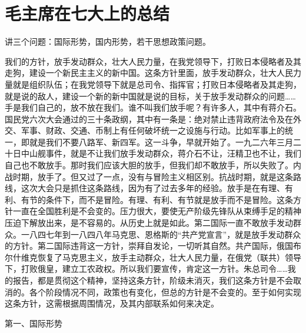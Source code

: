 \section[毛主席在七大上的总结（一九四五年六月）]{毛主席在七大上的总结}


讲三个问题：国际形势，国内形势，若干思想政策问题。

我们的方针，放手发动群众，壮大人民力量，在我党领导下，打败日本侵略者及其走狗，建设一个新民主主义的新中国。这条方针里面，放手发动群众，壮大人民力量就是组织队伍；在我党领导下就是总司令、指挥官；打败日本侵略者及其走狗，就是说的敌人，建设一个新的新中国就是说的目标，关于放手发动群众的问题……手是我们自己的，放不放在我们。谁不叫我们放手呢？有许多人，其中有蒋介石。国民党六次大会通过的三十条政纲，其中有一条是：绝对禁止违背政府法令及在外交、军事、财政、交通、币制上有任何破坏统一之设施与行动。比如军事上的统一，即就是我们不要八路军、新四军。这一斗争，早就开始了。一九二六年三月二十日中山舰事件，就是不让我们放手发动群众，蒋介石不让，汪精卫也不让，我们自己也不敢放手。那时我们应该大胆的放手，但我们却不敢放手，所以失败了。内战时期，放手了。但又过了一点，没有与冒险主义相区别。抗战时期，就是这条路线，这次大会只是抓住这条路线，因为有了过去多年的经验。放手是在有理、有利、有节的条件下，而不是冒险。有理、有利、有节就是放手而不是冒险。这条方针一直在全国胜利是不会变的。压力很大，要使无产阶级先锋队从束缚手足的精神压迫下解放出来，是不容易的。从历史上就是如此。第二国际一直不敢放手发动群众。一八四七年到一八四八年马克思、恩格斯的“共产党宣言”，就是放手发动群众的方针。第二国际违背这一方针，崇拜自发论，一切听其自然。共产国际，俄国布尔什维克恢复了马克思主义，放手主动群众，壮大人民力量，在俄党（联共）领导下，打败俄皇，建立工农政权。所以我们要宣传，肯定这一方针。朱总司令……我的报告，都是贯彻这个精神，坚持这条方针，阶级未消灭，我们这条方针是不会取消的。各个阶段情况不同，政策也有变化，但总的方针是不会变的。至于如何实现这条方针，这需根据周围情况，及其内部联系如何来决定。

第一、国际形势

